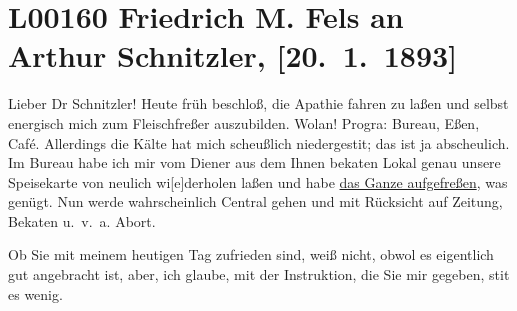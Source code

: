 

\section[Friedrich M. Fels an Arthur Schnitzler, {[}20. 1. 1893{]}]{L00160 Friedrich M. Fels an Arthur Schnitzler, {[}20. 1. 1893{]}}
\nopagebreak{}
\rehead{ }\normalsize\beginnumbering{}
\toendnotes[C]{\smallbreak\pagebreak[2]}
\toendnotes[C]{\smallbreak}
\toendnotes[C]{\smallbreak}
\pstart
           \noindent{}{\pb}Lieber Dr Schnitzler! Heute früh beschloß, die Apathie fahren zu
               laßen und selbst energisch mich zum Fleischfreßer auszubilden. Wolan! Progra{\geminationm}: Bureau, Eßen, Café. Allerdings die Kälte hat mich
               scheußlich niedergesti{\geminationm}t; das ist ja abscheulich. Im
               Bureau habe ich mir vom Diener aus dem Ihnen beka{\geminationn}ten
               Lokal genau unsere Speisekarte von neulich wi{[}e{]}derholen laßen und
               habe \uline{das Ganze aufgefreßen}, was genügt. Nun werde
               wahrscheinlich Central gehen und mit Rücksicht
               auf Zeitung, Beka{\geminationn}ten u. v. a. Abort.\pend
           
\pstart
           Ob Sie mit meinem heutigen Tag zufrieden sind, weiß \label{T_L00160-1v}\label{T_L00160-1} nicht, obwol es eigentlich \introOben{}gut\introOben{} angebracht ist, aber, ich glaube, mit der Instruktion, die Sie mir
               gegeben, sti{\geminationm}t es wenig.\pend
           
